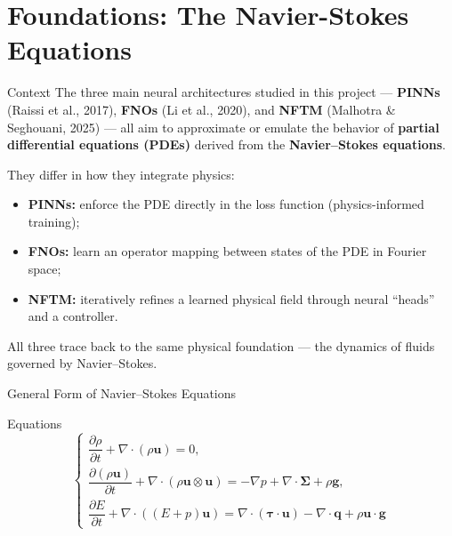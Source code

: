 \section{Foundations: The Navier-Stokes Equations}

\begin{secframe}
\small

\vspace{0.6em}

\begin{block}{Context}
The three main neural architectures studied in this project —  
\textbf{PINNs} (Raissi et al., 2017), \textbf{FNOs} (Li et al., 2020),  
and \textbf{NFTM} (Malhotra \& Seghouani, 2025) —  
all aim to approximate or emulate the behavior of \textbf{partial differential equations (PDEs)} derived from the \textbf{Navier–Stokes equations}.  

They differ in how they integrate physics:
\begin{itemize}
  \item \textbf{PINNs:} enforce the PDE directly in the loss function (physics-informed training);
  \item \textbf{FNOs:} learn an operator mapping between states of the PDE in Fourier space;
  \item \textbf{NFTM:} iteratively refines a learned physical field through neural “heads” and a controller.
\end{itemize}
All three trace back to the same physical foundation — the dynamics of fluids governed by Navier–Stokes.
\end{block}
\end{secframe}




\begin{secframe}
\small
\textcolor{red_unipd}{\Large General Form of Navier--Stokes Equations}

\vspace{0.6em}

\begin{alertblock}{Equations}
\[
\begin{cases}
\dfrac{\partial \rho}{\partial t}
+ \nabla\!\cdot\!(\rho \mathbf{u}) = 0,\\[16pt]

\dfrac{\partial (\rho \mathbf{u})}{\partial t}
+ \nabla\!\cdot\!(\rho \mathbf{u} \otimes \mathbf{u})
= -\nabla p + \nabla\!\cdot\!\boldsymbol{\Sigma} + \rho \mathbf{g},\\[16pt]

\dfrac{\partial E}{\partial t}
+ \nabla\!\cdot\!((E+p)\mathbf{u})
= \nabla\!\cdot\!(\boldsymbol{\tau}\!\cdot\!\mathbf{u})
- \nabla\!\cdot\!\mathbf{q} + \rho \mathbf{u}\!\cdot\!\mathbf{g}
\end{cases}
\]
\end{alertblock}

\end{secframe}




